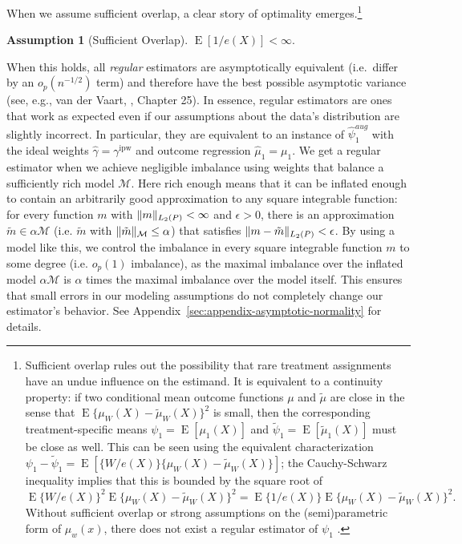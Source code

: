 \documentclass{article}
\DeclarePairedDelimiter\norm{\lVert}{\rVert}
\theoremstyle{definition}
\newtheorem{assumption}{Assumption}
\DeclareMathOperator{\E}{E}
\newcommand{\ipw}{\text{ipw}}
\newcommand{\hgamma}{\ensuremath{\hat\gamma}}
\newcommand{\gammaipw}{\ensuremath{\gamma^{\ipw}}}
\newcommand{\model}{\mathcal{M}}
\newcommand{\<}{\langle}
\renewcommand{\>}{\rangle}
\begin{document}
When we assume sufficient overlap, a clear story of optimality emerges.\footnote{Sufficient overlap rules out the possibility that rare treatment assignments have an undue influence on the estimand. It is equivalent to a continuity property: if two conditional mean outcome functions $\mu$ and $\tilde \mu$ are close in the sense that $\E \{\mu_W(X)-\tilde \mu_W(X)\}^2$
is small, then the corresponding treatment-specific means $\psi_1=\E[\mu_1(X)]$ and $\tilde\psi_1 = \E[\tilde \mu_1(X)]$ must be close as well. This can be seen using the equivalent characterization $\psi_1-\tilde \psi_1 = \E[\{W/e(X)\} \{\mu_{W}(X)-\tilde \mu_{W}(X)\}]$; the Cauchy-Schwarz inequality implies that this is bounded by the square root of
$\E\{W/e(X)\}^2 \E\{\mu_{W}(X)-\tilde \mu_{W}(X)\}^2=\E\{1/e(X)\} \E\{\mu_{W}(X)-\tilde \mu_{W}(X)\}^2.$
Without sufficient overlap or strong assumptions on the (semi)parametric form of $\mu_w(x)$, there does not exist a regular estimator of $\psi_1$ \citep{van1991differentiable}.}
{\addtocounter{assumption}{-1}%
   \renewcommand{\theassumption}{\arabic{assumption}$'$}
\begin{assumption}[Sufficient Overlap]
\label{a:regular-overlap}
$\E[1 / e(X)] < \infty.$
\addtocounter{theorem}{-1}
\end{assumption}}
When this holds, all \emph{regular} estimators are asymptotically equivalent (i.e.\ differ by an $o_p(n^{-1/2})$ term) and therefore have the best possible asymptotic variance (see, e.g., van der Vaart, \citeyear{van2000asymptotic}, Chapter 25). In essence, regular estimators are ones that work as expected even if our assumptions about the data's distribution are slightly incorrect. In particular, they are equivalent to an instance of $\hat\psi_1^{aug}$ with the ideal weights $\hgamma=\gammaipw$ and  outcome regression  $\hat \mu_1=\mu_1$.
We get a regular estimator when we achieve negligible imbalance using weights that balance a
sufficiently rich model $\model$. Here rich enough means that it can be inflated enough to contain an arbitrarily good approximation to any square integrable function:
for every function $m$ with $\norm{m}_{L_2(P)} < \infty$ and $\epsilon>0$, there is an approximation $\tilde m \in \alpha \model$ (i.e. $\tilde m$ with $\norm{\tilde m}_\model \le \alpha$) that satisfies $\norm{m-\tilde m}_{L_2(P)} < \epsilon$.
By using a model like this, we control the imbalance in every square integrable function $m$ to some degree (i.e. $o_p(1)$ imbalance), as the maximal imbalance over the inflated model $\alpha \model$ is $\alpha$ times the maximal imbalance over the model itself. This ensures that small errors in our modeling assumptions do not completely change our estimator's behavior. See Appendix~\ref{sec:appendix-asymptotic-normality} for details.
\end{document}
